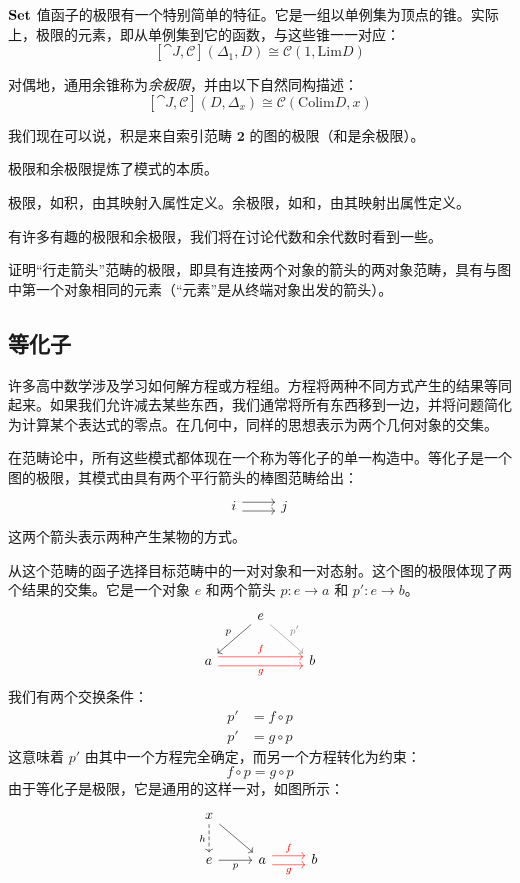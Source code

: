 \documentclass[DaoFP]{subfiles}
\begin{document}
$\mathbf{Set}$ 值函子的极限有一个特别简单的特征。它是一组以单例集为顶点的锥。实际上，极限的元素，即从单例集到它的函数，与这些锥一一对应：
\[ [\cat J, \mathcal{C}](\Delta_1, D)  \cong \mathcal{C}(1, \text{Lim}D) \]

对偶地，通用余锥称为\emph{余极限}，并由以下自然同构描述：
\[ [\cat J, \mathcal{C}](D, \Delta_x)  \cong \mathcal{C}( \text{Colim}D, x) \]

我们现在可以说，积是来自索引范畴 $\mathbf{2}$ 的图的极限（和是余极限）。

极限和余极限提炼了模式的本质。

极限，如积，由其映射入属性定义。余极限，如和，由其映射出属性定义。

有许多有趣的极限和余极限，我们将在讨论代数和余代数时看到一些。

\begin{exercise}
证明“行走箭头”范畴的极限，即具有连接两个对象的箭头的两对象范畴，具有与图中第一个对象相同的元素（“元素”是从终端对象出发的箭头）。
\end{exercise}

\subsection{等化子}

许多高中数学涉及学习如何解方程或方程组。方程将两种不同方式产生的结果等同起来。如果我们允许减去某些东西，我们通常将所有东西移到一边，并将问题简化为计算某个表达式的零点。在几何中，同样的思想表示为两个几何对象的交集。

在范畴论中，所有这些模式都体现在一个称为等化子的单一构造中。等化子是一个图的极限，其模式由具有两个平行箭头的棒图范畴给出：
\[
\begin{tikzcd}
i \arrow[r, shift left=0.75ex]
  \arrow[r, shift right=0.75ex]
&
j
\end{tikzcd}
\]
这两个箭头表示两种产生某物的方式。

从这个范畴的函子选择目标范畴中的一对对象和一对态射。这个图的极限体现了两个结果的交集。它是一个对象 $e$ 和两个箭头 $p \colon e \to a$ 和 $p' \colon e \to b$。
\[
\begin{tikzcd}
& e
\arrow[dl, "p"']
\arrow[dr, gray, "p'"]
\\
a 
\arrow[rr, red, shift left=.75ex, "f"]
\arrow[rr, red, shift right=.75ex, "g"']
&&
b
\end{tikzcd}
\]
我们有两个交换条件：
\begin{align*}
p' &= f \circ p \\
p' &= g \circ p
\end{align*}
这意味着 $p'$ 由其中一个方程完全确定，而另一个方程转化为约束：
\[ f \circ p = g \circ p \]
由于等化子是极限，它是通用的这样一对，如图所示：
\[
\begin{tikzcd}
x
\arrow[d, dashed, "h"']
\arrow[dr, ""]
\\
e
\arrow[r, "p"']
&
a \arrow[r, red, shift left=0.75ex, "f"]
  \arrow[r, red, shift right=0.75ex, "g"']
&
b
\end{tikzcd}
\]
\end{document}

